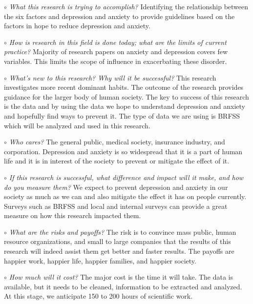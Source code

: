\documentclass[letterpaper, 10 pt, conference]{ieeeconf}  %
\begin{document}
\noindent\textit{$\circ$ What this research is trying to accomplish?} \newline
\textnormal{
Identifying the relationship between the six factors and depression and anxiety to 
provide guidelines based on the factors in hope to reduce depression and anxiety.
}

\setlength{\parskip}{1em} %

\par\noindent\textit{$\circ$ How is research in this field is done today; what are the limits of current practice?}\newline
\textnormal{
Majority of research papers on anxiety and depression covers few variables. 
This limits the scope of influence in exacerbating these disorder. 
}

\par\noindent\textit{$\circ$ What's new to this research? Why will it be successful?}\newline
\textnormal{
This research investigates more recent dominant habits. The outcome  of  the  research  provides  
guidance  for  the larger  body of human society. The key to success of this research is the data 
and by using the data we hope to understand depression and anxiety and hopefully find ways to prevent it. 
The type of data we are using is BRFSS which will be analyzed and used in this research.
}

\par\noindent\textit{$\circ$ Who cares?}\newline
\textnormal{
The general public, medical society, insurance industry, and corporation.  Depression  and  anxiety is 
so widespread that it is a part of  human  life  and  it  is  in  interest  of  the society to  
prevent or mitigate  the effect of it.
}

\par\noindent\textit{$\circ$ If this research is successful, what difference and impact will it make, and how do you measure them?}\newline
\textnormal{
We expect to prevent depression and anxiety in our society as much as we can and also mitigate 
the effect it has on people currently. Surveys  such  as  BRFSS  and  local  and  internal 
surveys  can  provide  a  great  measure  on  how  this  research impacted them.
}

\par\noindent\textit{$\circ$ What are the risks and payoffs?}\newline
\textnormal{
The risk is to convince mass public, human resource organizations, and small 
to large companies that the results of this research will indeed assist them 
get better and faster results. The payoffs are happier work, happier life, 
happier families, and happier society.  
}
\par\noindent\textit{$\circ$ How much will it cost?}\newline
\textnormal{
The major cost is the time it will take. The data is available, 
but it needs to be cleaned, information to be extracted and 
analyzed. At this stage, we anticipate 150 to 200 hours of scientific work. 
}
\end{document}

